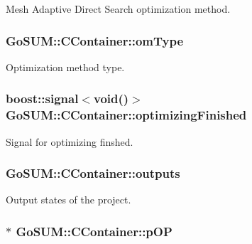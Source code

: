 Mesh Adaptive Direct Search optimization method. 

\hypertarget{class_go_s_u_m_1_1_c_container_a1e9582618d0ba3ef25fda4359092ee4d}{
\subsubsection[{om\-Type}]{ Go\-S\-U\-M\-::\-C\-Container\-::om\-Type\hspace{0.3cm}{\ttfamily [private]}}}\label{class_go_s_u_m_1_1_c_container_a1e9582618d0ba3ef25fda4359092ee4d}


Optimization method type. 

\hypertarget{class_go_s_u_m_1_1_c_container_a13d00751fa7d80b99cba527e8d57327c}{
\subsubsection[{optimizing\-Finished}]{\setlength{\rightskip}{0pt plus 5cm}boost\-::signal$<$void()$>$ Go\-S\-U\-M\-::\-C\-Container\-::optimizing\-Finished}}\label{class_go_s_u_m_1_1_c_container_a13d00751fa7d80b99cba527e8d57327c}


Signal for optimizing finshed. 

\hypertarget{class_go_s_u_m_1_1_c_container_a3312afd03c8b6cfd72d46961a9afa136}{
\subsubsection[{outputs}]{ Go\-S\-U\-M\-::\-C\-Container\-::outputs\hspace{0.3cm}{\ttfamily [private]}}}\label{class_go_s_u_m_1_1_c_container_a3312afd03c8b6cfd72d46961a9afa136}


Output states of the project. 

\hypertarget{class_go_s_u_m_1_1_c_container_adeb8fce52629b3f9172a4ff0187ec040}{
\subsubsection[{p\-O\-P}]{$\ast$ Go\-S\-U\-M\-::\-C\-Container\-::p\-O\-P\hspace{0.3cm}{\ttfamily [private]}}}\label{class_go_s_u_m_1_1_c_container_adeb8fce52629b3f9172a4ff0187ec040}


